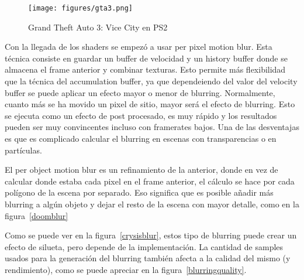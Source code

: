 \documentclass[withindex, glossary]{cam-thesis}
\begin{document}
\begin{figure}[!htbp]
    \texttt{[image: figures/gta3.png]}
    \caption{Grand Theft Auto 3: Vice City en PS2}
    \label{gta3}
\end{figure}

Con la llegada de los shaders se empezó a usar per pixel motion blur. Esta técnica consiste en guardar un buffer de velocidad y un history buffer donde se almacena el frame anterior y combinar texturas. Esto permite más flexibilidad que la técnica del accumulation buffer, ya que dependeiendo del valor del velocity buffer se puede aplicar un efecto mayor o menor de blurring. Normalmente, cuanto más se ha movido un pixel de sitio, mayor será el efecto de blurring. Esto se ejecuta como un efecto de post procesado, es muy rápido y los resultados pueden ser muy convincentes incluso con framerates bajos. Una de las desventajas es que es complicado calcular el blurring en escenas con transparencias o en partículas.

El per object motion blur es un refinamiento de la anterior, donde en vez de calcular donde estaba cada pixel en el frame anterior, el cálculo se hace por cada polígono de la escena por separado. Eso significa que es posible añadir más blurring a algún objeto y dejar el resto de la escena con mayor detalle, como en la figura~\ref{doomblur}

Como se puede ver en la figura~\ref{crysisblur}, estos tipo de blurring puede crear un efecto de silueta, pero depende de la implementación. La cantidad de samples usados para la generación del blurring también afecta a la calidad del mismo (y rendimiento), como se puede apreciar en la figura~\ref{blurringquality}.
\end{document}
